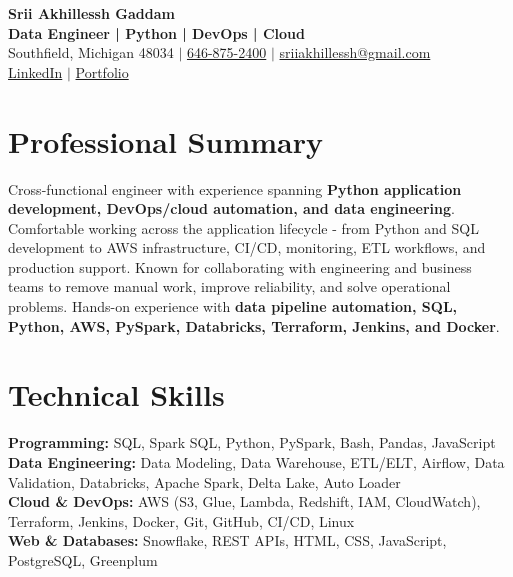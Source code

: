 \documentclass[letterpaper,10pt]{article}
\begin{document}
\fontsize{9.35pt}{10.45pt}\selectfont

\begin{center}
    {\LARGE \textbf{Srii Akhillessh Gaddam}} \\[-1pt]
    \textbf{Data Engineer | Python | DevOps | Cloud} \\[2pt]
    Southfield, Michigan 48034 $|$
    \href{tel:6468752400}{646-875-2400} $|$
    \href{mailto:sriiakhillessh@gmail.com}{sriiakhillessh@gmail.com} \\[1pt]
    \href{https://www.linkedin.com/in/srii-akhiilessh-gaddam-b48668191/}{LinkedIn} $|$
    \href{https://sriiakhillesshg.github.io/portfolio/}{Portfolio}
\end{center}
\vspace{-8pt}

\section{Professional Summary}
\small{Cross-functional engineer with experience spanning \textbf{Python application development, DevOps/cloud automation, and data engineering}. Comfortable working across the application lifecycle - from Python and SQL development to AWS infrastructure, CI/CD, monitoring, ETL workflows, and production support. Known for collaborating with engineering and business teams to remove manual work, improve reliability, and solve operational problems. Hands-on experience with \textbf{data pipeline automation, SQL, Python, AWS, PySpark, Databricks, Terraform, Jenkins, and Docker}.}

\section{Technical Skills}
\small{
\textbf{Programming:} SQL, Spark SQL, Python, PySpark, Bash, Pandas, JavaScript \\
\textbf{Data Engineering:} Data Modeling, Data Warehouse, ETL/ELT, Airflow, Data Validation, Databricks, Apache Spark, Delta Lake, Auto Loader \\
\textbf{Cloud \& DevOps:} AWS (S3, Glue, Lambda, Redshift, IAM, CloudWatch), Terraform, Jenkins, Docker, Git, GitHub, CI/CD, Linux \\
\textbf{Web \& Databases:} Snowflake, REST APIs, HTML, CSS, JavaScript, PostgreSQL, Greenplum
}
\end{document}
